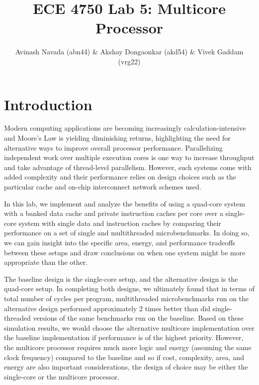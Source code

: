 \documentclass[10pt]{article}
\begin{document}
\title{ECE 4750 Lab 5: Multicore Processor}
\author{Avinash Navada (abn44) \& Akshay Dongaonkar (akd54) 
		\& Vivek Gaddam (vrg22)}
\maketitle


\section{Introduction}

Modern computing applications are becoming increasingly calculation-intensive and Moore's Law is yielding diminishing returns, highlighting the need for alternative ways to improve overall processor performance. Parallelizing independent work over multiple execution cores is one way to increase throughput and take advantage of thread-level parallelism. However, such systems come with added complexity and their performance relies on design choices such as the particular
cache and on-chip interconnect network schemes used. \par

In this lab, we implement and analyze the benefits of using a quad-core system with a banked data cache and private instruction caches per core over a single-core system with single data and instruction caches by comparing their performance on a set of single and multithreaded microbenchmarks. In doing so, we can gain insight into the specific area, energy, and performance tradeoffs between these setups and draw conclusions on when one system might be more appropriate than the other. \par

The baseline design is the single-core setup, and the alternative design is the quad-core setup. In completing both designs, we ultimately found that in terms of total number of cycles per program, multithreaded microbenchmarks run on the alternative design performed approximately 2 times better than did single-threaded versions of the same benchmarks run on the baseline. Based on these simulation results, we would choose the alternative multicore implementation over the baseline implementation if performance is of the highest priority. However, the multicore processor requires much more logic and energy (assuming the same clock frequency) compared to the baseline and so if cost, complexity, area, and energy are also important considerations, the design of choice may be either the single-core or the multicore processor. 
\end{document}
